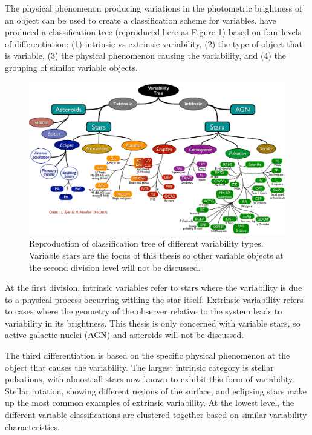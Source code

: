 The physical phenomenon producing variations in the photometric brightness of an object can be used to create a classification scheme for variables. \citet{eyer_variable_2008} have produced a classification tree (reproduced here as Figure \ref{fig:variability_tree}) based on four levels of differentiation: (1) intrinsic vs extrinsic variability, (2) the type of object that is variable, (3) the physical phenomenon causing the variability, and (4) the grouping of similar variable objects.

\begin{figure}[htbp]
    \centering
    \includegraphics[height=0.78\linewidth,angle=-90]{Chapter1/variable_EyerMowlavi08.png}
    \caption[Variability classification tree]{Reproduction of \citet{eyer_variable_2008} classification tree of different variability types. Variable stars are the focus of this thesis so other variable objects at the second division level will not be discussed.}
    \label{fig:variability_tree}
\end{figure}

At the first division, intrinsic variables refer to stars where the variability is due to a physical process occurring withing the star itself. Extrinsic variability refers to cases where the geometry of the observer relative to the system leads to variability in its brightness. This thesis is only concerned with variable stars, so active galactic nuclei (AGN) and asteroids will not be discussed. 

The third differentiation is based on the specific physical phenomenon at the object that causes the variability. The largest intrinsic category is stellar pulsations, with almost all stars now known to exhibit this form of variability. Stellar rotation, showing different regions of the surface, and eclipsing stars make up the most common examples of extrinsic variability. At the lowest level, the different variable classifications are clustered together based on similar variability characteristics.

